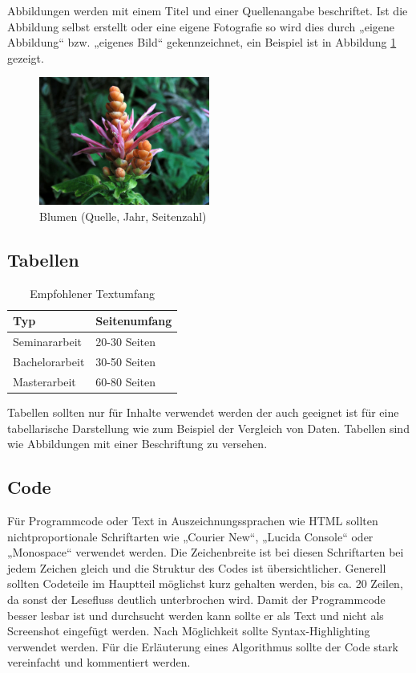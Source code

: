 Abbildungen werden mit einem Titel und einer Quellenangabe beschriftet. Ist die Abbildung selbst erstellt oder eine eigene Fotografie so wird dies durch „eigene Abbildung“ bzw. „eigenes Bild“ gekennzeichnet, ein Beispiel ist in Abbildung \ref{fig:abbildung} gezeigt.

\begin{figure}
	\centering
	\includegraphics[width=0.5\textwidth]{images/blume}
	\caption{Blumen (Quelle, Jahr, Seitenzahl)}
	\label{fig:abbildung}
\end{figure}

\subsection{Tabellen}\label{subsubsec:tabellen}

{\renewcommand{\arraystretch}{1.5}
\begin{table}[h!]
\centering
\begin{tabular}{ l|l } 
\hline
\bfseries Typ & \bfseries Seitenumfang\\
\hline
Seminararbeit & 20-30 Seiten \\
Bachelorarbeit & 30-50 Seiten \\
Masterarbeit & 60-80 Seiten \\
\hline
\end{tabular}
\caption{Empfohlener Textumfang}
\label{table:textumfang}
\end{table}}

Tabellen sollten nur für Inhalte verwendet werden der auch geeignet ist für eine tabellarische Darstellung wie zum Beispiel der Vergleich von Daten. Tabellen sind wie Abbildungen mit einer Beschriftung zu versehen.

\subsection{Code}\label{subsubsec:code}

Für Programmcode oder Text in Auszeichnungssprachen wie HTML sollten nichtproportionale Schriftarten wie „Courier New“, „Lucida Console“ oder „Monospace“ verwendet werden. Die Zeichenbreite ist bei diesen Schriftarten bei jedem Zeichen gleich und die Struktur des Codes ist übersichtlicher. Generell sollten Codeteile im Hauptteil möglichst kurz gehalten werden, bis ca. 20 Zeilen, da sonst der Lesefluss deutlich unterbrochen wird.  Damit der Programmcode besser lesbar ist und durchsucht werden kann sollte er als Text und nicht als Screenshot eingefügt werden. Nach Möglichkeit sollte Syntax-Highlighting verwendet werden. Für die  Erläuterung eines Algorithmus sollte der Code stark vereinfacht und kommentiert werden.


